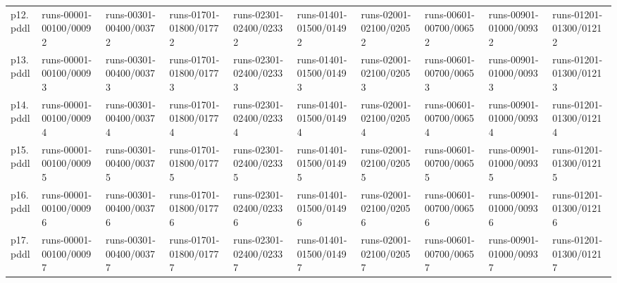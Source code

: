 \documentclass{article}
\begin{document}
\begin{tabular}{@{}lrrrrrrrrr@{}}
p12.pddl & \multicolumn{1}{|l|}{runs-00001-00100/00092} & \multicolumn{1}{|l|}{runs-00301-00400/00372} & \multicolumn{1}{|l|}{runs-01701-01800/01772} & \multicolumn{1}{|l|}{runs-02301-02400/02332} & \multicolumn{1}{|l|}{runs-01401-01500/01492} & \multicolumn{1}{|l|}{runs-02001-02100/02052} & \multicolumn{1}{|l|}{runs-00601-00700/00652} & \multicolumn{1}{|l|}{runs-00901-01000/00932} & \multicolumn{1}{|l|}{runs-01201-01300/01212} \\
p13.pddl & \multicolumn{1}{|l|}{runs-00001-00100/00093} & \multicolumn{1}{|l|}{runs-00301-00400/00373} & \multicolumn{1}{|l|}{runs-01701-01800/01773} & \multicolumn{1}{|l|}{runs-02301-02400/02333} & \multicolumn{1}{|l|}{runs-01401-01500/01493} & \multicolumn{1}{|l|}{runs-02001-02100/02053} & \multicolumn{1}{|l|}{runs-00601-00700/00653} & \multicolumn{1}{|l|}{runs-00901-01000/00933} & \multicolumn{1}{|l|}{runs-01201-01300/01213} \\
p14.pddl & \multicolumn{1}{|l|}{runs-00001-00100/00094} & \multicolumn{1}{|l|}{runs-00301-00400/00374} & \multicolumn{1}{|l|}{runs-01701-01800/01774} & \multicolumn{1}{|l|}{runs-02301-02400/02334} & \multicolumn{1}{|l|}{runs-01401-01500/01494} & \multicolumn{1}{|l|}{runs-02001-02100/02054} & \multicolumn{1}{|l|}{runs-00601-00700/00654} & \multicolumn{1}{|l|}{runs-00901-01000/00934} & \multicolumn{1}{|l|}{runs-01201-01300/01214} \\
p15.pddl & \multicolumn{1}{|l|}{runs-00001-00100/00095} & \multicolumn{1}{|l|}{runs-00301-00400/00375} & \multicolumn{1}{|l|}{runs-01701-01800/01775} & \multicolumn{1}{|l|}{runs-02301-02400/02335} & \multicolumn{1}{|l|}{runs-01401-01500/01495} & \multicolumn{1}{|l|}{runs-02001-02100/02055} & \multicolumn{1}{|l|}{runs-00601-00700/00655} & \multicolumn{1}{|l|}{runs-00901-01000/00935} & \multicolumn{1}{|l|}{runs-01201-01300/01215} \\
p16.pddl & \multicolumn{1}{|l|}{runs-00001-00100/00096} & \multicolumn{1}{|l|}{runs-00301-00400/00376} & \multicolumn{1}{|l|}{runs-01701-01800/01776} & \multicolumn{1}{|l|}{runs-02301-02400/02336} & \multicolumn{1}{|l|}{runs-01401-01500/01496} & \multicolumn{1}{|l|}{runs-02001-02100/02056} & \multicolumn{1}{|l|}{runs-00601-00700/00656} & \multicolumn{1}{|l|}{runs-00901-01000/00936} & \multicolumn{1}{|l|}{runs-01201-01300/01216} \\
p17.pddl & \multicolumn{1}{|l|}{runs-00001-00100/00097} & \multicolumn{1}{|l|}{runs-00301-00400/00377} & \multicolumn{1}{|l|}{runs-01701-01800/01777} & \multicolumn{1}{|l|}{runs-02301-02400/02337} & \multicolumn{1}{|l|}{runs-01401-01500/01497} & \multicolumn{1}{|l|}{runs-02001-02100/02057} & \multicolumn{1}{|l|}{runs-00601-00700/00657} & \multicolumn{1}{|l|}{runs-00901-01000/00937} & \multicolumn{1}{|l|}{runs-01201-01300/01217} \\

\end{tabular}
\end{document}
